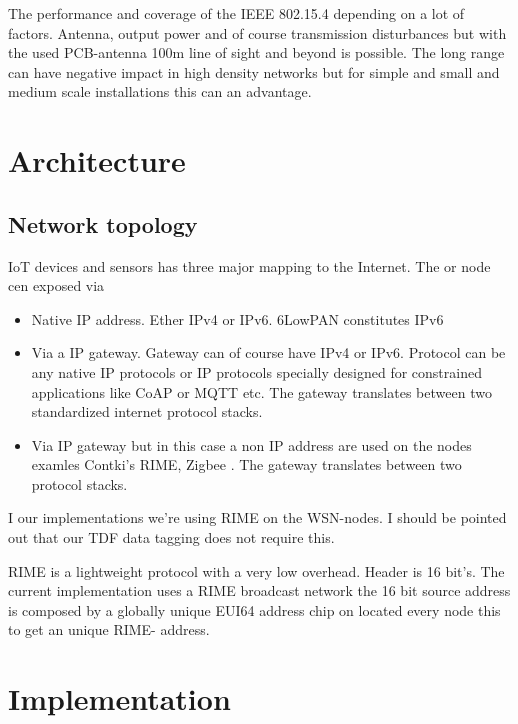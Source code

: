 \documentclass[conference, a4paper,10pt,twocolumn]{IEEEtran}
\begin{document}
The performance and coverage of the IEEE 802.15.4 depending on a lot of factors. Antenna, output
power and of course transmission disturbances but with the used PCB-antenna 100m line of sight and 
beyond is possible. The long range can have negative impact in high density networks but for simple 
and small and medium scale installations this can an advantage.


\section{Architecture}
\label{sec:architecture}
 

\subsection{Network topology}

IoT devices and sensors has three major mapping to the Internet. The 
or node cen exposed via

\begin{itemize}

\item Native IP address. Ether IPv4 or IPv6. 6LowPAN constitutes IPv6


\item Via a IP gateway. Gateway can of course have IPv4 or IPv6. Protocol
can be any native IP protocols or IP protocols specially designed 
for constrained applications like CoAP or MQTT etc. The gateway 
translates between two standardized internet protocol stacks. 


\item  Via IP gateway but in this case a non IP address are used on
the nodes examles Contki's RIME, Zigbee . The gateway translates 
between two protocol stacks. 

\end{itemize}

I our implementations we're using RIME on the WSN-nodes. I should
be pointed out that our TDF data tagging does not require this.

RIME is a lightweight protocol with a very low overhead. Header is 
16 bit's. The current implementation uses a RIME broadcast network
the 16 bit source address is composed by a globally unique EUI64 
address chip on located every node this to get an unique RIME-
address. 



\section{Implementation}
\label{sec:implementation}
\end{document}
